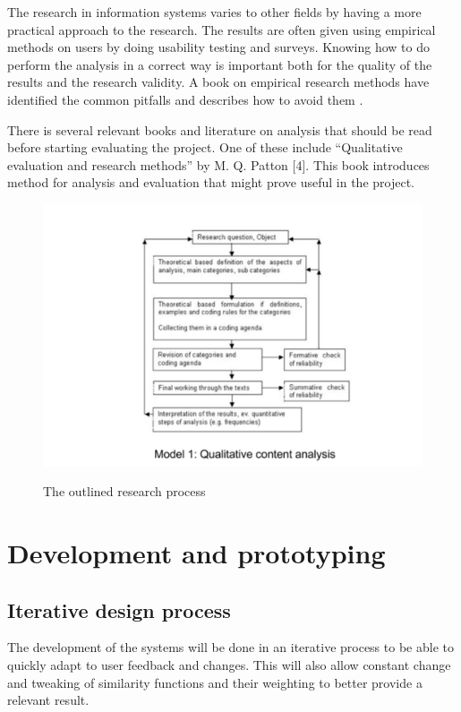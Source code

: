 The research in information systems varies to other fields by having a more practical approach to the research. The results are often given using empirical methods on users by doing usability testing and surveys. Knowing how to do perform the analysis in a correct way is important both for the quality of the results and the research validity. A book on empirical research methods have identified the common pitfalls and describes how to avoid them \cite{kitchenham2002preliminary}.

There is several relevant books and literature on analysis that should be read before starting evaluating the project. One of these include “Qualitative evaluation and research methods” by M. Q. Patton [4]. This book introduces method for analysis and evaluation that might prove useful in the project.

\begin{figure}
    \centering
    \includegraphics[width=\textwidth]{fig/method.png}
    \label{fig:qualitytative_content}
    \caption{The outlined research process\cite{oates2005researching}}
\end{figure}

\section{Development and prototyping}

\subsection{Iterative design process}
The development of the systems will be done in an iterative process to be able to quickly adapt to user feedback and changes. This will also allow constant change and tweaking of similarity functions and their weighting to better provide a relevant result.

